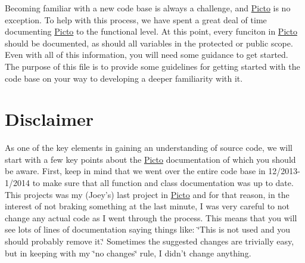 Becoming familiar with a new code base is always a challenge, and \hyperlink{namespace_picto}{Picto} is no exception. To help with this process, we have spent a great deal of time documenting \hyperlink{namespace_picto}{Picto} to the functional level. At this point, every funciton in \hyperlink{namespace_picto}{Picto} should be documented, as should all variables in the protected or public scope. Even with all of this information, you will need some guidance to get started. The purpose of this file is to provide some guidelines for getting started with the code base on your way to developing a deeper familiarity with it.\hypertarget{first_code_look_first_look_disclaimer}{}\section{Disclaimer}\label{first_code_look_first_look_disclaimer}
As one of the key elements in gaining an understanding of source code, we will start with a few key points about the \hyperlink{namespace_picto}{Picto} documentation of which you should be aware. First, keep in mind that we went over the entire code base in 12/2013-\/1/2014 to make sure that all function and class documentation was up to date. This projects was my (Joey's) last project in \hyperlink{namespace_picto}{Picto} and for that reason, in the interest of not braking something at the last minute, I was very careful to not change any actual code as I went through the process. This means that you will see lots of lines of documentation saying things like\-: \char`\"{}\-This is not used and you should probably remove it.\char`\"{} Sometimes the suggested changes are trivially easy, but in keeping with my \char`\"{}no changes\char`\"{} rule, I didn't change anything.

